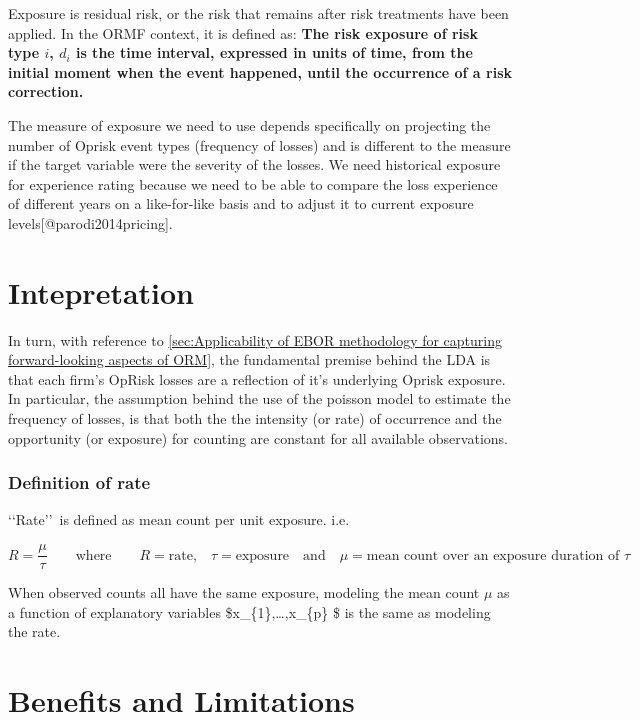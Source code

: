 \documentclass[]{article}
\begin{document}
Exposure is residual risk, or the risk that remains after risk
treatments have been applied. In the ORMF context, it is defined as:
\textbf{The risk exposure of risk type $i$, $d_{i}$ is the time interval, expressed in units of time, from the initial moment when the event happened, until the occurrence of a risk correction.}

The measure of exposure we need to use depends specifically on
projecting the number of Oprisk event types (frequency of losses) and is
different to the measure if the target variable were the severity of the
losses. We need historical exposure for experience rating because we
need to be able to compare the loss experience of different years on a
like-for-like basis and to adjust it to current exposure
levels{[}@parodi2014pricing{]}.

\section{Intepretation}
\label{sec:Intepretation}

In turn, with reference to
\ref{sec:Applicability of EBOR methodology for capturing forward-looking aspects of ORM},
the fundamental premise behind the LDA is that each firm's OpRisk losses
are a reflection of it's underlying Oprisk exposure. In particular, the
assumption behind the use of the poisson model to estimate the frequency
of losses, is that both the the intensity (or rate) of occurrence and
the opportunity (or exposure) for counting are constant for all
available observations.

\subsubsection{Definition of rate}

\lq\lq Rate\rq\rq~is defined as mean count per unit exposure. i.e.

\begin{equation}
R = \frac{\mu}{\tau} \qquad \mbox{where} \qquad \mbox{$R = $rate,} \quad \mbox{$\tau = $exposure} \quad \mbox{and} \quad \mbox{$\mu = $mean count over an exposure duration of $\tau$} \nonumber
\end{equation}

When observed counts all have the same exposure, modeling the mean count
\(\mu\) as a function of explanatory variables
\$x\_\{1\},\ldots,x\_\{p\} \$ is the same as modeling the rate.

\section{Benefits and Limitations}
\label{sec:Benefits and Limitations}
\end{document}
